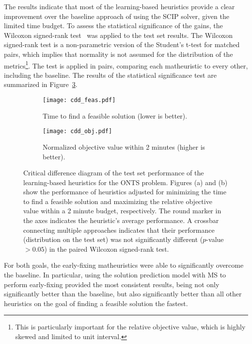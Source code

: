 The results indicate that most of the learning-based heuristics provide a clear improvement over the baseline approach of using the SCIP solver, given the limited time budget.
To assess the statistical significance of the gains, the Wilcoxon signed-rank test~\cite{wilcoxon_1945} was applied to the test set results.
The Wilcoxon signed-rank test is a non-parametric version of the Student's t-test for matched pairs, which implies that normality is not assumed for the distribution of the metrics\footnote{This is particularly important for the relative objective value, which is highly skewed and limited to unit interval.}.
The test is applied in pairs, comparing each matheuristic to every other, including the baseline.
The results of the statistical significance test are summarized in Figure~\ref{fig:cdds}.

\begin{figure}[h]
    \centering
    \begin{subfigure}{0.99\textwidth}
        \centering
        \texttt{[image: cdd\_feas.pdf]}
        \caption{Time to find a feasible solution (lower is better).}
        \label{fig:cdd-feas}
    \end{subfigure}
    \begin{subfigure}{0.99\textwidth}
        \centering
        \texttt{[image: cdd\_obj.pdf]}
        \caption{Normalized objective value within 2 minutes (higher is better).}
        \label{fig:cdd-obj}
    \end{subfigure}
    \caption{%
    Critical difference diagram of the test set performance of the learning-based heuristics for the ONTS problem.
    Figures (a) and (b) show the performance of heuristics adjusted for minimizing the time to find a feasible solution and maximizing the relative objective value within a 2 minute budget, respectively.
    The round marker in the axes indicates the heuristic's average performance.
    A crossbar connecting multiple approaches indicates that their performance (distribution on the test set) was not significantly different ($p$-value $>0.05$) in the paired Wilcoxon signed-rank test.
    }
    \label{fig:cdds}
\end{figure}

For both goals, the early-fixing matheuristics were able to significantly overcome the baseline.
In particular, using the solution prediction model with MS to perform early-fixing provided the most consistent results, being not only significantly better than the baseline, but also significantly better than all other heuristics on the goal of finding a feasible solution the fastest.

